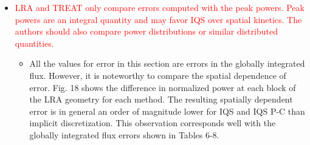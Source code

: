 \documentclass{elsarticle}
\newcommand{\done}{\checkmark}
\newcommand{\hard}[1]{\textcolor{Red}{#1}}
\begin{document}
\begin{itemize}
\item[\done] \hard{ LRA and TREAT only compare errors computed with the peak powers. Peak powers are an integral quantity and may favor IQS over spatial kinetics. The authors should also compare power distributions or similar distributed quantities. }
\begin{itemize}
\item All the values for error in this section are errors in the globally integrated flux. However, it is noteworthy to compare the spatial dependence of error. Fig. 18 shows the difference in normalized power at each block of the LRA geometry for each method. The resulting spatially dependent error is in general an order of magnitude lower for IQS and IQS P-C than implicit discretization. This observation corresponds well with the globally integrated flux errors shown in Tables 6-8. 
\end{itemize}
\end{itemize}
\end{document}
